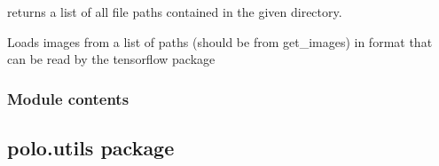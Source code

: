 \documentclass[letterpaper,10pt,english]{sphinxmanual}
\begin{document}

\begin{fulllineitems}
\label{\detokenize{polo.marco:polo.marco.run_marco.get_images}}
returns a list of all file paths contained in the given directory.

\end{fulllineitems}


\begin{fulllineitems}
\label{\detokenize{polo.marco:polo.marco.run_marco.load_image}}
\end{fulllineitems}


\begin{fulllineitems}
\label{\detokenize{polo.marco:polo.marco.run_marco.load_images}}
Loads images from a list of paths (should be from get\_images) in format
that can be read by the tensorflow package

\end{fulllineitems}



\subsubsection{Module contents}
\label{\detokenize{polo.marco:module-polo.marco}}\label{\detokenize{polo.marco:module-contents}}

\subsection{polo.utils package}
\label{\detokenize{polo.utils:polo-utils-package}}\label{\detokenize{polo.utils::doc}}
\end{document}
